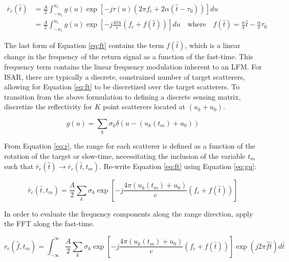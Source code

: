 \documentclass[fleqn,10pt]{olplainarticle}
\begin{document}
\begin{equation}
    \begin{aligned}
        \bar{r}_{c}(\hat{t}) &= \frac{A}{2} \int_{-u_{1}}^{u_{1}} g(u) \exp [-j \tau (u)(2\pi f_{c} + 2\alpha (\hat{t} - \tau_{0}))] du \\
         &= \frac{A}{2} \int_{-u_{1}}^{u_{1}} g(u) \exp \left[-j \frac{4\pi u}{c}( f_{c} + f(\hat{t}))\right] du \quad \mathrm{where} \quad f(\hat{t}) = \frac{\alpha }{\pi} \hat{t} - \frac{\alpha}{\pi} \tau_{0}
    \end{aligned}
    \label{eq:ft}
\end{equation}

\noindent The last form of Equation \ref{eq:ft} contains the term $f(\hat{t})$, which is a linear change in the frequency of the return signal as a function of the fast-time. This frequency term contains the linear frequency modulation inherent to an LFM. For ISAR, there are typically a discrete, constrained number of target scatterers, allowing for Equation \ref{eq:ft} to be discretized over the target scatterers. To transition from the above formulation to defining a discrete sensing matrix, discretize the reflectivity for $K$ point scatterers located at $(u_{k} + u_{0})$.

\begin{equation}
    g(u) = \sum_{k} \sigma_{k} \delta(u - (u_{k}(t_m) + u_{0}))
    \label{eq:gu}
\end{equation}

\noindent From Equation \ref{eq:r}, the range for each scatterer is defined as a function of the rotation of the target or slow-time, necessitating the inclusion of the variable $t_{m}$ such that $\bar{r}_{c}(\hat{t}) \rightarrow \bar{r}_{c}(\hat{t},t_{m})$. Re-write Equation \ref{eq:ft} using Equation \ref{eq:gu}:

\begin{equation}
    \bar{r}_{c}(\hat{t}, t_{m}) = \frac{A}{2}\sum_{k} \sigma_{k} \exp \left[ -j \frac{4\pi (u_{k}(t_m) + u_{0})}{c} (f_{c} + f(\hat{t}))\right]
    \label{eq:rc}
\end{equation}

\noindent In order to evaluate the frequency components along the range direction, apply the FFT along the fast-time.

\begin{equation}
    r_{c}(\hat{f}, t_{m}) = \int_{-\infty}^{\infty} \frac{A}{2} \sum_{k}\sigma_{k} \exp \left[ -j \frac{4\pi (u_{k}(t_m) + u_{0})}{c} (f_{c} + f(\hat{t}))\right] \exp(j 2 \pi \hat{f}\hat{t}) d\hat{t}
    \label{eq:rc_hat_f}
\end{equation}
\end{document}
